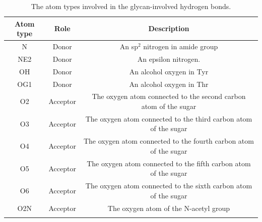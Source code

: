 \documentclass[sn-vancouver]{sn-jnl}
\begin{document}
\begin{table}[ht]
\caption{The atom types involved in the glycan-involved hydrogen bonds.}
\label{supple_tab: atom_types}
\centering
\begin{tabular}{@{}ccc@{}}
\toprule
Atom type & Role     & Description                                                      \\ \midrule
N         & Donor    & An sp$^{2}$ nitrogen in amide group                              \\ %
NE2       & Donor    & An epsilon nitrogen.                                             \\ %
OH        & Donor    & An alcohol oxygen in Tyr                                        \\ %
OG1       & Donor    & An alcohol oxygen in Thr                                        \\ %
O2        & Acceptor & The oxygen atom connected to the second carbon atom of the sugar \\ %
O3        & Acceptor & The oxygen atom connected to the third carbon atom of the sugar  \\ %
O4        & Acceptor & The oxygen atom connected to the fourth carbon atom of the sugar \\ %
O5        & Acceptor & The oxygen atom connected to the fifth carbon atom of the sugar  \\ %
O6        & Acceptor & The oxygen atom connected to the sixth carbon atom of the sugar  \\ %
O2N       & Acceptor & The oxygen atom of the N-acetyl group                            \\ \botrule
\end{tabular}
\end{table}
\end{document}
